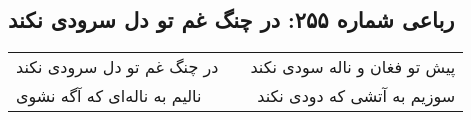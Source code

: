 \begin{center}
\section*{رباعی شماره ۲۵۵: در چنگ غم تو دل سرودی نکند}
\label{sec:sh255}
\begin{longtable}{l p{0.5cm} r}
در چنگ غم تو دل سرودی نکند
&&
پیش تو فغان و ناله سودی نکند
\\
نالیم به ناله‌ای که آگه نشوی
&&
سوزیم به آتشی که دودی نکند
\\
\end{longtable}
\end{center}
